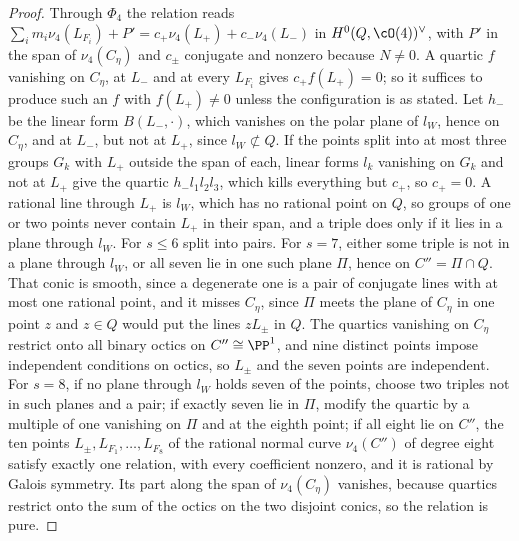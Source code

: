 \begin{proof}
Through $\Phi_{4}$ the relation reads
$\sum_{i}m_{i}\nu_{4}(L_{F_{i}})+P'=c_{+}\nu_{4}(L_{+})+c_{-}\nu_{4}(L_{-})$ in
$H^{0}(Q,\cO(4))^{\vee}$, with $P'$ in the span of $\nu_{4}(C_{\eta})$ and
$c_{\pm}$ conjugate and nonzero because $N\ne0$. A quartic $f$ vanishing on
$C_{\eta}$, at $L_{-}$ and at every $L_{F_{i}}$ gives $c_{+}f(L_{+})=0$; so it
suffices to produce such an $f$ with $f(L_{+})\ne0$ unless the configuration
is as stated. Let $h_{-}$ be the linear form $B(L_{-},\cdot)$, which vanishes on the polar
plane of $l_{W}$, hence on $C_{\eta}$, and at $L_{-}$, but not at $L_{+}$,
since $l_{W}\not\subset Q$. If the points split into at most three groups
$G_{k}$ with $L_{+}$ outside the span of each, linear forms $l_{k}$ vanishing
on $G_{k}$ and not at $L_{+}$ give the quartic $h_{-}l_{1}l_{2}l_{3}$, which
kills everything but $c_{+}$, so $c_{+}=0$. A rational line through $L_{+}$ is
$l_{W}$, which has no rational point on $Q$, so groups of one or two points
never contain $L_{+}$ in their span, and a triple does only if it lies in a
plane through $l_{W}$. For $s\le6$ split into pairs. For $s=7$, either some
triple is not in a plane through $l_{W}$, or all seven lie in one such plane
$\Pi$, hence on $C''=\Pi\cap Q$. That conic is smooth, since a degenerate one
is a pair of conjugate lines with at most one rational point, and it misses
$C_{\eta}$, since $\Pi$ meets the plane of $C_{\eta}$ in one point $z$ and
$z\in Q$ would put the lines $zL_{\pm}$ in $Q$. The quartics vanishing on
$C_{\eta}$ restrict onto all binary octics on $C''\cong\PP^{1}$, and nine
distinct points impose independent conditions on octics, so $L_{\pm}$ and the
seven points are independent. For $s=8$, if no plane through $l_{W}$ holds
seven of the points, choose two triples not in such planes and a pair; if
exactly seven lie in $\Pi$, modify the quartic by a multiple of one vanishing
on $\Pi$ and at the eighth point; if all eight lie on $C''$, the ten points
$L_{\pm},L_{F_{1}},\dots,L_{F_{8}}$ of the rational normal curve
$\nu_{4}(C'')$ of degree eight satisfy exactly one relation, with every
coefficient nonzero, and it is rational by Galois symmetry. Its part along the
span of $\nu_{4}(C_{\eta})$ vanishes, because quartics restrict onto the sum of
the octics on the two disjoint conics, so the relation is pure.
\end{proof}

